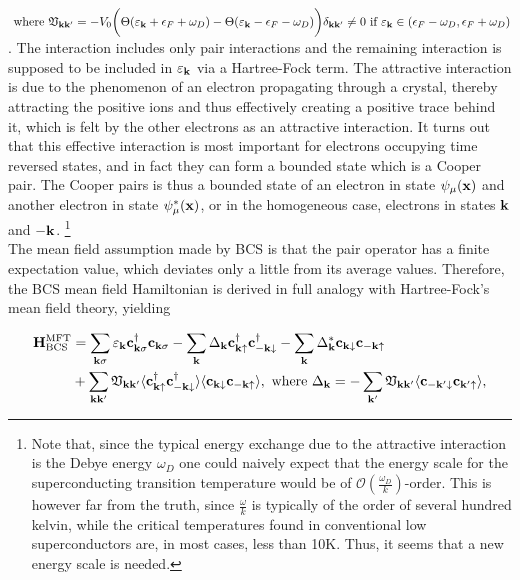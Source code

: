 \documentclass{homework}
\begin{document}
$\textnormal{ where } {\mathfrak{V}}_{{\bf k}{\bf k}'} = -V_0 \bigg(\Theta(\varepsilon_{\bf k} + \epsilon_F + \omega_D) - \Theta(\varepsilon_{\bf k} - \epsilon_F - \omega_D)\bigg) \delta_{{\bf k}{\bf k}'} \neq 0 \textnormal{ if }\varepsilon_{{\bf k}} \in (\epsilon_F - \omega_D, \epsilon_F + \omega_D)$. The interaction includes only pair interactions and the remaining interaction is supposed to be included in $\varepsilon_{{\bf k}}$ via a Hartree-Fock term. The attractive interaction is due to the phenomenon of an electron propagating through a crystal, thereby attracting the positive ions and thus effectively creating a positive trace behind it, which is felt by the other electrons as an attractive interaction. It turns out that this effective interaction is most important for electrons occupying time reversed states, and in fact they can form a bounded state which is a Cooper pair. The Cooper pairs is thus a bounded state of an electron in state $\psi_{\mu}({\bf x})$ and another electron in state $\psi_{\mu}^*({\bf x})$, or in the homogeneous case, electrons in states ${\bf k}$ and ${\bf -k}$. \footnote{Note that, since the typical energy exchange due to the attractive interaction is the Debye energy $\omega_D$ one could naively expect that the energy scale for the superconducting transition temperature would be of $\mathcal{O}(\frac{\omega_D}{k})$-order. This is however far from the truth, since $\frac{\omega}{k}$ is typically of the order of several hundred kelvin, while the critical temperatures found in conventional low superconductors are, in most cases, less than 10K. Thus, it seems that a new energy scale is needed. }\\ 

The mean field assumption made by BCS is that the pair operator has a finite expectation value, which deviates only a little from its average values. Therefore, the BCS mean field Hamiltonian is derived in full analogy with Hartree-Fock's mean field theory, yielding

\begin{equation}
    \begin{split}
        {\bf H}_{\textnormal{BCS}}^{\textnormal{MFT}} &=  \sum_{{\bf k} \sigma} \varepsilon_{{\bf k}} {\bf c}_{{\bf k} \sigma}^\dagger {\bf c}_{{\bf k} \sigma} - \sum_{{\bf k}} \Delta_{{\bf k}} {\bf c}_{{\bf k} \uparrow}^\dagger {\bf c}_{-{\bf k} \downarrow}^\dagger - \sum_{{\bf k}} \Delta^*_{{\bf k}} {\bf c}_{{\bf k} \downarrow} {\bf c}_{-{\bf k} \uparrow} \\
        &+ \sum_{{\bf k}{\bf k}'} \mathfrak{V}_{{\bf k}{\bf k}'} \langle {\bf c}_{{\bf k} \uparrow}^\dagger {\bf c}_{-{\bf k} \downarrow}^\dagger \rangle \langle {\bf c}_{{\bf k} \downarrow} {\bf c}_{-{\bf k} \uparrow} \rangle, \textnormal{ where } \Delta_{{\bf k}} = - \sum_{{\bf k'}} \mathfrak{V}_{{\bf k} {\bf k'}} \langle  {\bf c}_{-{\bf k}' \downarrow} {\bf c}_{{\bf k}' \uparrow} \rangle,
        \label{BCS hamiltonian}
    \end{split}
\end{equation}
\end{document}
